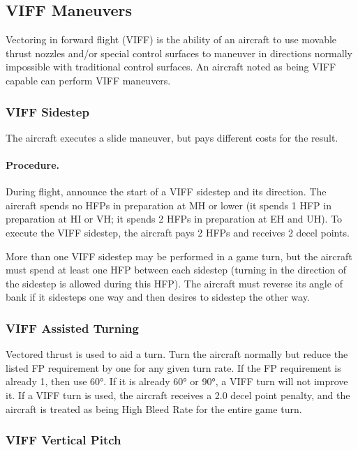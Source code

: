\subsection{VIFF Maneuvers}

Vectoring in forward flight (VIFF) is the ability of an aircraft to use movable thrust nozzles and/or special control surfaces to maneuver in directions normally impossible with traditional control surfaces. An aircraft noted as being VIFF capable can perform VIFF maneuvers. 

\subsubsection{VIFF Sidestep}

The aircraft executes a slide maneuver, but pays different costs for the result.

\paragraph{Procedure.} During flight, announce the start of a VIFF sidestep and its direction. The aircraft spends no HFPs in preparation at MH or lower (it spends 1 HFP in preparation at HI or VH; it spends 2 HFPs in preparation at EH and UH). To execute the VIFF sidestep, the aircraft pays 2 HFPs and receives 2 decel points.

More than one VIFF sidestep may be performed in a game turn, but the aircraft must spend at least one HFP between each sidestep (turning in the direction of the sidestep is allowed during this HFP). The aircraft must reverse its angle of bank if it sidesteps one way and then desires to sidestep the other way.

\subsubsection{VIFF Assisted Turning}

Vectored thrust is used to aid a turn. Turn the aircraft normally but reduce the listed FP requirement by one for any given turn rate. If the FP requirement is already 1, then use 60°. If it is already 60° or 90°, a VIFF turn will not improve it. If a VIFF turn is used, the aircraft receives a 2.0 decel point penalty, and the aircraft is treated as being High Bleed Rate for the entire game turn.

\subsubsection{VIFF Vertical Pitch}


